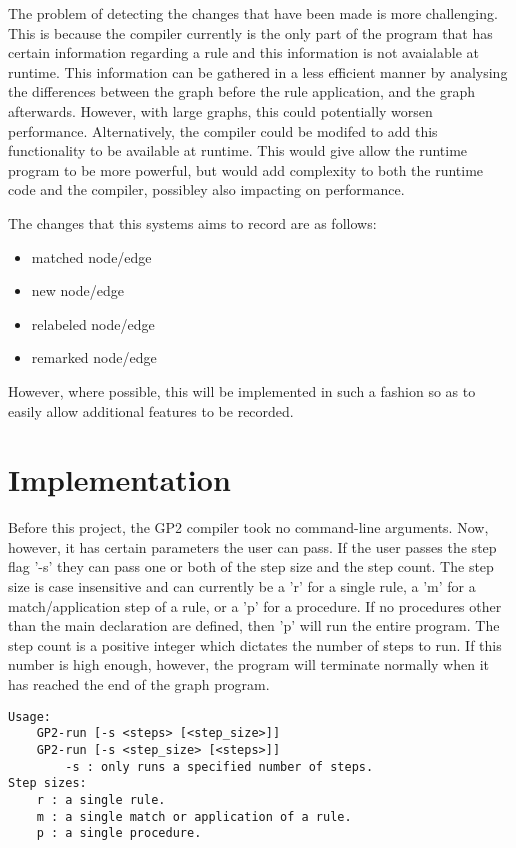 \documentclass{UoYCSproject}
\begin{document}
The problem of detecting the changes that have been made is more challenging. This is because the compiler currently is the only part of the program that has certain information regarding a rule and this information is not avaialable at runtime. This information can be gathered in a less efficient manner by analysing the differences between the graph before the rule application, and the graph afterwards. However, with large graphs, this could potentially worsen performance. Alternatively, the compiler could be modifed to add this functionality to be available at runtime. This would give allow the runtime program to be more powerful, but would add complexity to both the runtime code and the compiler, possibley also impacting on performance.

The changes that this systems aims to record are as follows:
\begin{itemize}
	\item matched node/edge
	\item new node/edge
	\item relabeled node/edge
	\item remarked node/edge
\end{itemize}

However, where possible, this will be implemented in such a fashion so as to easily allow additional features to be recorded.

\chapter{Implementation}

Before this project, the GP2 compiler took no command-line arguments. Now, however, it has certain parameters the user can pass. If the user passes the step flag '-s' they can pass one or both of the step size and the step count. The step size is case insensitive and can currently be a 'r' for a single rule, a 'm' for a match/application step of a rule, or a 'p' for a procedure. If no procedures other than the main declaration are defined, then 'p' will run the entire program. The step count is a positive integer which dictates the number of steps to run. If this number is high enough, however, the program will terminate normally when it has reached the end of the graph program.

\begin{lstlisting}[label=code:usage, caption=GP2 Usage]
Usage:
    GP2-run [-s <steps> [<step_size>]]
    GP2-run [-s <step_size> [<steps>]]
        -s : only runs a specified number of steps.
Step sizes:
    r : a single rule.
    m : a single match or application of a rule.
    p : a single procedure.
\end{lstlisting}
\end{document}
